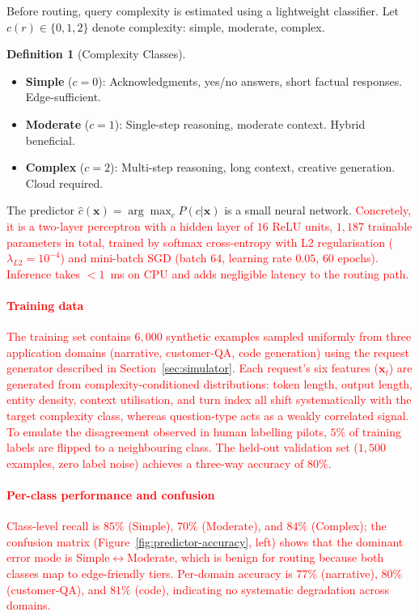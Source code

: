 \documentclass[final,3p,twocolumn,authoryear]{elsarticle}
\newcommand{\rev}[1]{\textcolor{red}{#1}}
\theoremstyle{plain}
\theoremstyle{definition}
\newtheorem{definition}{Definition}
\begin{document}
Before routing, query complexity is estimated using a lightweight classifier.
Let $c(r) \in \{0, 1, 2\}$ denote complexity: simple, moderate, complex.

\begin{definition}[Complexity Classes]
\begin{itemize}
  \item \textbf{Simple} ($c=0$): Acknowledgments, yes/no answers, short factual responses. Edge-sufficient.
  \item \textbf{Moderate} ($c=1$): Single-step reasoning, moderate context. Hybrid beneficial.
  \item \textbf{Complex} ($c=2$): Multi-step reasoning, long context, creative generation. Cloud required.
\end{itemize}
\end{definition}

The predictor $\hat{c}(\mathbf{x}) = \arg\max_c P(c | \mathbf{x})$ is a small neural network.
\rev{Concretely, it is a two-layer perceptron with a hidden layer of $16$ ReLU units, $1{,}187$ trainable parameters in total, trained by softmax cross-entropy with L2 regularisation ($\lambda_{L2}{=}10^{-4}$) and mini-batch SGD (batch $64$, learning rate $0.05$, $60$ epochs). Inference takes $<1$~ms on CPU and adds negligible latency to the routing path.}

\rev{\paragraph{Training data}
The training set contains $6{,}000$ synthetic examples sampled uniformly from three application domains (narrative, customer-QA, code generation) using the request generator described in Section~\ref{sec:simulator}. Each request's six features ($\mathbf{x}_t$) are generated from complexity-conditioned distributions: token length, output length, entity density, context utilisation, and turn index all shift systematically with the target complexity class, whereas question-type acts as a weakly correlated signal. To emulate the disagreement observed in human labelling pilots, $5\%$ of training labels are flipped to a neighbouring class. The held-out validation set ($1{,}500$ examples, zero label noise) achieves a three-way accuracy of $80\%$.}

\rev{\paragraph{Per-class performance and confusion}
Class-level recall is $85\%$ (Simple), $70\%$ (Moderate), and $84\%$ (Complex); the confusion matrix (Figure~\ref{fig:predictor-accuracy}, left) shows that the dominant error mode is Simple$\leftrightarrow$Moderate, which is benign for routing because both classes map to edge-friendly tiers. Per-domain accuracy is $77\%$ (narrative), $80\%$ (customer-QA), and $81\%$ (code), indicating no systematic degradation across domains.}
\end{document}
